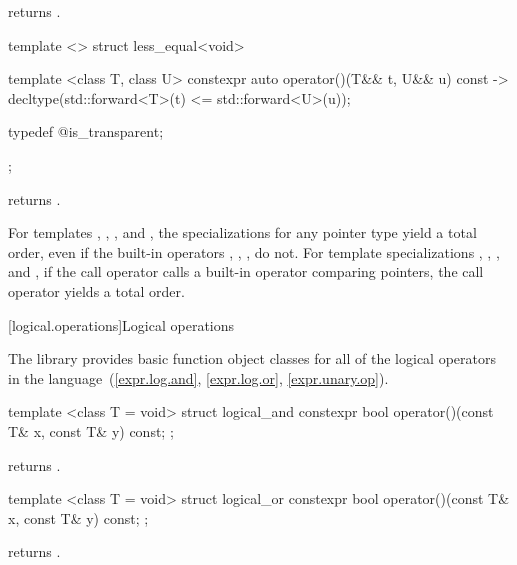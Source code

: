 \begin{itemdescr}
\pnum
{} returns .
\end{itemdescr}

%
\begin{itemdecl}
template <> struct less_equal<void> {
  template <class T, class U> constexpr auto operator()(T&& t, U&& u) const
    -> decltype(std::forward<T>(t) <= std::forward<U>(u));

  typedef @\unspec@ is_transparent;
};
\end{itemdecl}

\begin{itemdescr}
\pnum
{} returns .
\end{itemdescr}

\pnum
For templates , , , and
, the specializations for any pointer type yield a total order,
even if the built-in operators \tcode{<}, \tcode{>}, \tcode{<=}, \tcode{>=}
do not.
For template specializations , ,
, and ,
if the call operator calls a built-in operator comparing pointers,
the call operator yields a total order.

[logical.operations]{Logical operations}

\pnum
The library provides basic function object classes for all of the logical
operators in the language~(\ref{expr.log.and}, \ref{expr.log.or}, \ref{expr.unary.op}).

%
\begin{itemdecl}
template <class T = void> struct logical_and {
  constexpr bool operator()(const T& x, const T& y) const;
};
\end{itemdecl}

\begin{itemdescr}
\pnum
{} returns .
\end{itemdescr}

%
\begin{itemdecl}
template <class T = void> struct logical_or {
  constexpr bool operator()(const T& x, const T& y) const;
};
\end{itemdecl}

\begin{itemdescr}
\pnum
{} returns .
\end{itemdescr}

